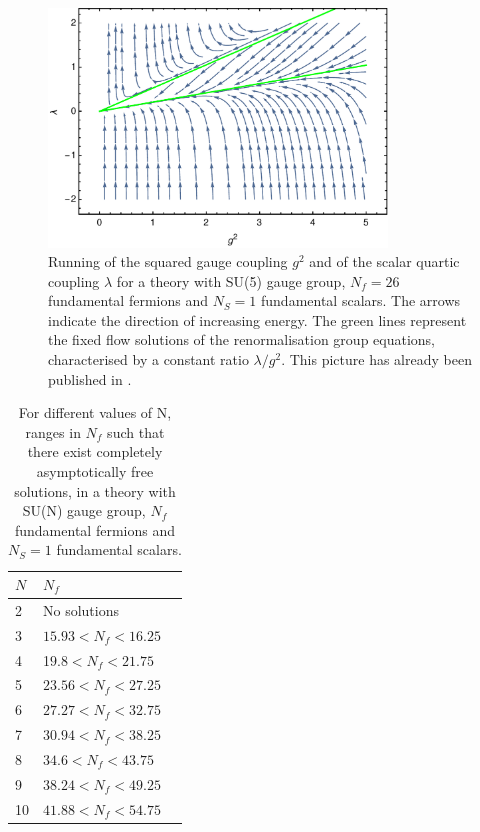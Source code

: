 \begin{figure}[thb] 
  \centering
  \includegraphics[width=9cm,clip]{pics/flow}
   \caption{Running of the squared gauge coupling $g^2$ and of the scalar quartic coupling $\lambda$ for a theory with SU(5) gauge group, $N_f=26$ fundamental fermions and $N_S =1$ fundamental scalars. The arrows indicate the direction of increasing energy. The green lines represent the fixed flow solutions of the renormalisation group equations, characterised by a constant ratio $\lambda/g^2$. This picture has already been published in \cite{Hansen:2017mrt}.}
  \label{flow_2D}
\end{figure}

\begin{table}[thb]
  \small
  \centering
  \caption{For different values of N, ranges in $N_f$ such that there exist completely asymptotically free solutions, in a theory with SU(N) gauge group, $N_f$ fundamental fermions and $N_S=1$ fundamental scalars.}
  \begin{tabular}{lll}\toprule
  $N$ & $N_f$  \\\midrule
  2 & No solutions \\
  3 & $15.93 < N_f < 16.25$ \\ 
  4 & 1$9.8 < N_f < 21.75$ \\
  5 & $23.56 < N_f < 27.25$ \\
  6 & $27.27 < N_f  < 32.75$ \\
  7 & $30.94 < N_f  < 38.25$ \\
  8 & $34.6 < N_f  < 43.75$ \\
  9 & $38.24 < N_f < 49.25$ \\
  10 & $41.88 < N_f < 54.75$ \\\bottomrule
  \end{tabular}
  \label{asympt_freedom}
\end{table}

